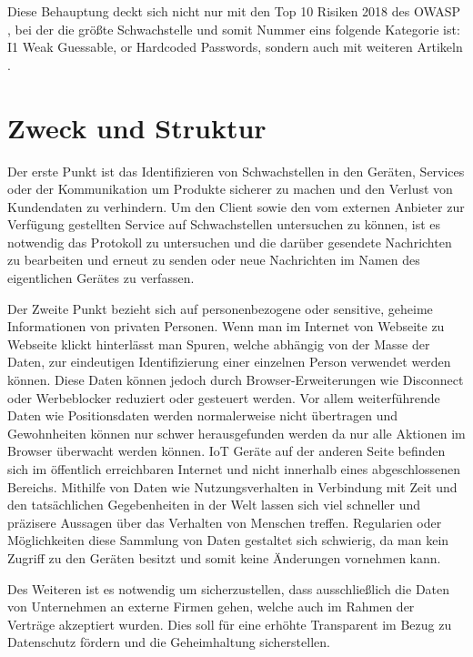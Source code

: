 Diese Behauptung deckt sich nicht nur mit den Top 10 Risiken 2018 des \ac{OWASP} \cite{guzman_2019}, bei der die größte Schwachstelle und somit Nummer eins folgende Kategorie ist: \glqq I1 Weak Guessable, or Hardcoded Passwords\grqq{}, sondern auch mit weiteren Artikeln \cite{eckstein_2018}.

\section{Zweck und Struktur}

    Der erste Punkt ist das Identifizieren von Schwachstellen in den Geräten, Services oder der Kommunikation  um Produkte sicherer zu machen und den Verlust von Kundendaten zu verhindern.
    Um den Client sowie den vom externen Anbieter zur Verfügung gestellten Service auf Schwachstellen untersuchen zu können, ist es notwendig das Protokoll zu untersuchen und die darüber gesendete Nachrichten zu bearbeiten und erneut zu senden oder neue Nachrichten im Namen des eigentlichen Gerätes zu verfassen.
    
    Der Zweite Punkt bezieht sich auf personenbezogene oder sensitive, geheime Informationen von privaten Personen.
    Wenn man im Internet von Webseite zu Webseite klickt hinterlässt man Spuren, welche abhängig von der Masse der Daten, zur eindeutigen Identifizierung einer einzelnen Person verwendet werden können. %
    Diese Daten können jedoch durch Browser-Erweiterungen wie Disconnect oder Werbeblocker reduziert oder gesteuert werden. Vor allem weiterführende Daten wie Positionsdaten werden normalerweise nicht übertragen und Gewohnheiten können nur schwer herausgefunden werden da nur alle Aktionen im Browser überwacht werden können.
    \ac{IoT} Geräte auf der anderen Seite befinden sich im öffentlich erreichbaren Internet und nicht innerhalb eines abgeschlossenen Bereichs. Mithilfe von Daten wie Nutzungsverhalten in Verbindung mit Zeit und den tatsächlichen Gegebenheiten in der Welt lassen sich viel schneller und präzisere Aussagen über das Verhalten von Menschen treffen. Regularien oder Möglichkeiten diese Sammlung von Daten gestaltet sich schwierig, da man kein Zugriff zu den Geräten besitzt und somit keine Änderungen vornehmen kann.
    
    Des Weiteren ist es notwendig um sicherzustellen, dass ausschließlich  die Daten von Unternehmen an externe Firmen gehen, welche auch im Rahmen der Verträge akzeptiert wurden. Dies soll für eine erhöhte Transparent im Bezug zu Datenschutz fördern und die Geheimhaltung sicherstellen.
    
